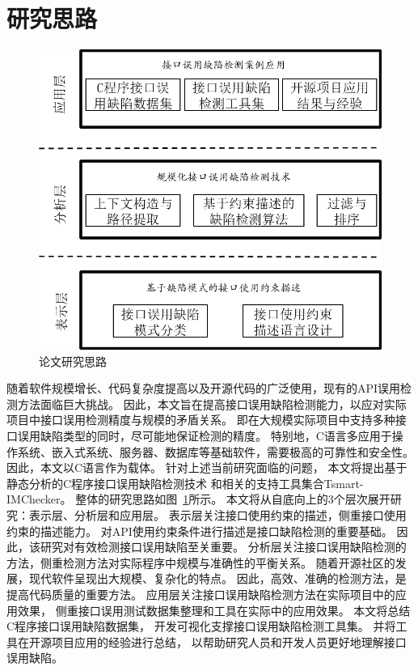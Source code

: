 \section{研究思路}

\begin{figure}[b]
	\centering
	\includegraphics[width=0.85\linewidth]{figures/cp1-overview.png}
	\caption{
		论文研究思路
	}
	\label{fig:1-3-overview}
\end{figure}

随着软件规模增长、代码复杂度提高以及开源代码的广泛使用，现有的API误用检测方法面临巨大挑战。
因此，本文旨在提高接口误用缺陷检测能力，以应对实际项目中接口误用检测精度与规模的矛盾关系。
即在大规模实际项目中支持多种接口误用缺陷类型的同时，尽可能地保证检测的精度。
特别地，C语言多应用于操作系统、嵌入式系统、服务器、数据库等基础软件，需要极高的可靠性和安全性。
因此，本文以C语言作为载体。
针对上述当前研究面临的问题，
本文将提出基于静态分析的C程序接口误用缺陷检测技术
和相关的支持工具集合Tsmart-IMChecker。
整体的研究思路如图~\ref{fig:1-3-overview}所示。
本文将从自底向上的3个层次展开研究：表示层、分析层和应用层。
表示层关注接口使用约束的描述，侧重接口使用约束的描述能力。
对API使用约束条件进行描述是接口缺陷检测的重要基础。
因此，该研究对有效检测接口误用缺陷至关重要。
分析层关注接口误用缺陷检测的方法，侧重检测方法对实际程序中规模与准确性的平衡关系。
随着开源社区的发展，现代软件呈现出大规模、复杂化的特点。
因此，高效、准确的检测方法，是提高代码质量的重要方法。
应用层关注接口误用缺陷检测方法在实际项目中的应用效果，
侧重接口误用测试数据集整理和工具在实际中的应用效果。
本文将总结C程序接口误用缺陷数据集，
开发可视化支撑接口误用缺陷检测工具集。
并将工具在开源项目应用的经验进行总结，
以帮助研究人员和开发人员更好地理解接口误用缺陷。

